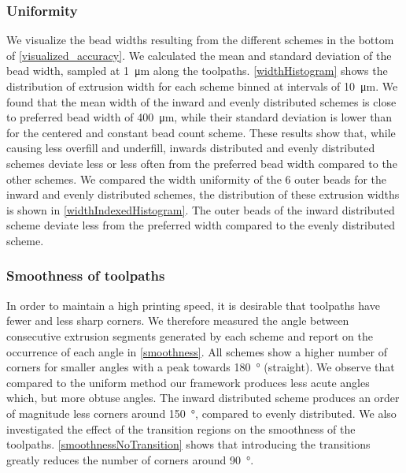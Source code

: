 








\subsubsection{Uniformity}
We visualize the bead widths resulting from the different schemes in the bottom of \cref{visualized_accuracy}.
We calculated the mean and standard deviation of the bead width, sampled at \SI{1}{\micro\meter} along the toolpaths.
\cref{widthHistogram} shows the distribution of extrusion width for each scheme binned at intervals of \SI{10}{\micro\meter}.
We found that the mean width of the inward and evenly distributed schemes is close to preferred bead width of \SI{400}{\micro\meter}, while their standard deviation is lower than for the centered and constant bead count scheme. 
These results show that, while causing less overfill and underfill, inwards distributed and evenly distributed schemes deviate less or less often from the preferred bead width compared to the other schemes.
We compared the width uniformity of the 6 outer beads for the inward and evenly distributed schemes, the distribution of these extrusion widths is shown in \cref{widthIndexedHistogram}. 
The outer beads of the inward distributed scheme deviate less from the preferred width compared to the evenly distributed scheme.

\subsubsection{Smoothness of toolpaths}
In order to maintain a high printing speed, it is desirable that toolpaths have fewer and less sharp corners. 
We therefore measured the angle between consecutive extrusion segments generated by each scheme
and report on the occurrence of each angle in \cref{smoothness}.
All schemes show a higher number of corners for smaller angles with a peak towards \SI{180}{\degree} (straight).
We observe that compared to the uniform method our framework produces less acute angles which, but more obtuse angles.
The inward distributed scheme produces an order of magnitude less corners around \SI{150}{\degree}, compared to evenly distributed. 
We also investigated the effect of the transition regions on the smoothness of the toolpaths. 
\cref{smoothnessNoTransition} shows that introducing the transitions greatly reduces the number of corners around \SI{90}{\degree}. 


